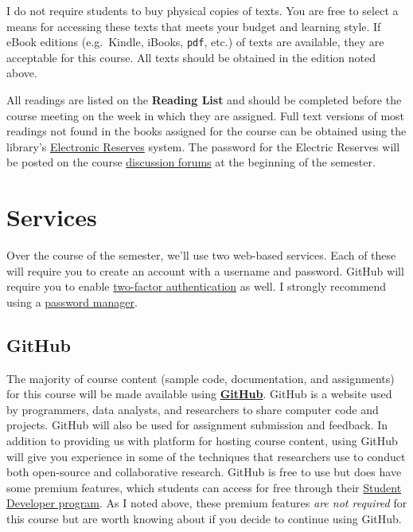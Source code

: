 \documentclass[]{book}
\begin{document}
I do not require students to buy physical copies of texts. You are free to select a means for accessing these texts that meets your budget and learning style. If eBook editions (e.g.~Kindle, iBooks, \texttt{pdf}, etc.) of texts are available, they are acceptable for this course. All texts should be obtained in the edition noted above.

All readings are listed on the \textbf{Reading List} and should be completed before the course meeting on the week in which they are assigned. Full text versions of most readings not found in the books assigned for the course can be obtained using the library's \href{http://eres.slu.edu/eres/coursepass.aspx?cid=4444}{Electronic Reserves} system. The password for the Electric Reserves will be posted on the course \href{https://discuss.slu-ssds.org}{discussion forums} at the beginning of the semester.

\hypertarget{services}{%
\section{Services}\label{services}}

Over the course of the semester, we'll use two web-based services. Each of these will require you to create an account with a username and password. GitHub will require you to enable \href{https://en.wikipedia.org/wiki/Multi-factor_authentication}{two-factor authentication} as well. I strongly recommend using a \href{https://lifehacker.com/5529133/five-best-password-managers}{password manager}.

\hypertarget{github}{%
\subsection{GitHub}\label{github}}

The majority of course content (sample code, documentation, and assignments) for this course will be made available using \textbf{\href{http://www.github.com}{GitHub}}. GitHub is a website used by programmers, data analysts, and researchers to share computer code and projects. GitHub will also be used for assignment submission and feedback. In addition to providing us with platform for hosting course content, using GitHub will give you experience in some of the techniques that researchers use to conduct both open-source and collaborative research. GitHub is free to use but does have some premium features, which students can access for free through their \href{https://education.github.com/pack/}{Student Developer program}. As I noted above, these premium features \emph{are not required} for this course but are worth knowing about if you decide to continue using GitHub.
\end{document}
